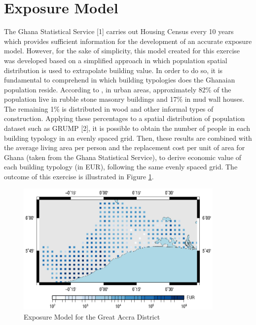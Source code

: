 \section{Exposure Model}
The Ghana Statistical Service [1] carries out Housing Census every
10 years which provides sufficient information for the development 
of an accurate exposure model. However, for the sake of simplicity,
this model created for this exercise was developed based on a simplified
approach in which population spatial distribution is used to extrapolate 
building value. In order to do so, it is fundamental to comprehend in
which building typologies does the Ghanaian population reside. 
%
According to \citet{jaiswal2008}, in urban areas, approximately 
82\% of the population live in rubble stone masonry buildings and 
17\% in mud wall houses. The remaining 1\% is distributed in wood
and other informal types of construction. Applying these percentages
to a spatial distribution of population dataset such as GRUMP [2], 
it is possible to obtain the number of people in each building 
typology in an evenly spaced grid. Then, these results are combined
with the average living area per person and the replacement cost 
per unit of area for Ghana (taken from the Ghana Statistical Service),
to derive economic value of each building typology (in EUR), 
following the same evenly spaced grid. The outcome of this 
exercise is illustrated in Figure \ref{fig:accra_exposure}.
%
\begin{figure}[htb]
	\centering
		\includegraphics[height=6.5cm, keepaspectratio=true]{./figures/exposure.eps}
	\caption{Exposure Model for the Great Accra District}
	\label{fig:accra_exposure}
\end{figure}
%
